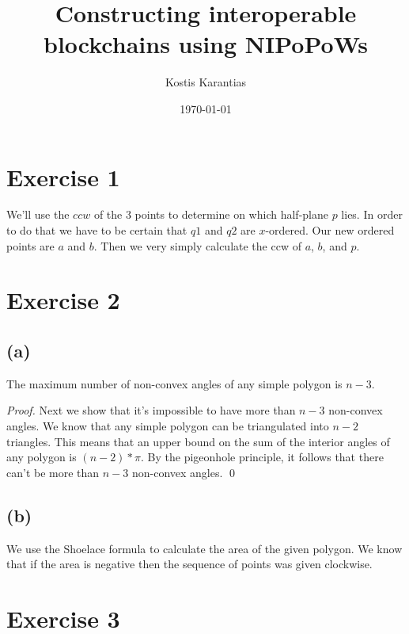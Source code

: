\documentclass[11pt]{llncs}
\begin{document}
\title{Constructing interoperable blockchains using NIPoPoWs}
\date{\today}
\author{Kostis Karantias\\
    }
\maketitle
\noindent
\makebox[\linewidth]{\small \today}

\thispagestyle{plain}

\section*{Exercise 1}
We'll use the $ccw$ of the 3 points to determine on which half-plane $p$ lies.
In order to do that we have to be certain that $q1$ and $q2$ are $x$-ordered.
Our new ordered points are $a$ and $b$. Then we very simply calculate the ccw
of $a$, $b$, and $p$.

\section*{Exercise 2}
\subsection*{(a)}
\begin{lemma}
The maximum number of non-convex angles of any simple polygon is $n-3$.
\end{lemma}
\begin{proof}
Next we show that it's impossible to have more than $n-3$ non-convex angles. We
know that any simple polygon can be triangulated into $n-2$ triangles. This
means that an upper bound on the sum of the interior angles of any
polygon is $(n-2) * \pi$. By the pigeonhole principle, it follows that
there can't be more than $n-3$ non-convex angles.
\qed
\end{proof}

\subsection*{(b)}

We use the Shoelace formula to calculate the area of the given polygon. We know
that if the area is negative then the sequence of points was given clockwise.

\section*{Exercise 3}
\end{document}
